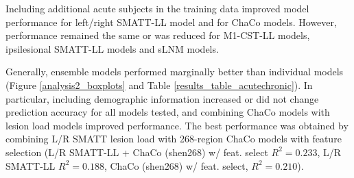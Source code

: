 \documentclass[10pt]{article}
\begin{document}
Including additional acute subjects in the training data improved model performance for left/right SMATT-LL model and for ChaCo models. However, performance remained the same or was reduced for M1-CST-LL models, ipsilesional SMATT-LL models and sLNM models.

Generally, ensemble models performed marginally better than individual models (Figure \ref{analysis2_boxplots} and Table \ref{results_table_acutechronic}). In particular, including demographic information increased or did not change prediction accuracy for all models tested, and combining ChaCo models with lesion load models improved performance.  The best performance was obtained by combining L/R SMATT lesion load with 268-region ChaCo models with feature selection (L/R SMATT-LL + ChaCo (shen268) w/ feat. select $R^2 = 0.233$, L/R SMATT-LL $R^2=0.188$, ChaCo (shen268) w/ feat. select, $R^2=0.210$).\\
\end{document}
